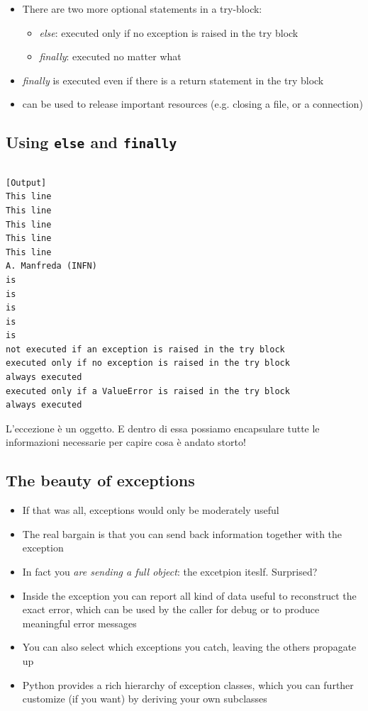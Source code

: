   \begin{itemize}
    \item There are two more optional statements in a try-block:
    \medskip
    \begin{itemize}
      \item \emph{else}: executed only if no exception is raised in the try block
      \medskip
      \item \emph{finally}: executed no matter what
      \medskip
    \end{itemize}
    \item \emph{finally} is executed even if there is a return statement in the try
          block
    \item can be used to release important resources (e.g. closing a
          file, or a connection)
  \end{itemize}

\subsection{Using \texttt{else} and \texttt{finally}}

\inputminted{python}{snippets/exceptions.py}
\begin{verbatim}
[Output]
This line
This line
This line
This line
This line
A. Manfreda (INFN)
is
is
is
is
is
not executed if an exception is raised in the try block
executed only if no exception is raised in the try block
always executed
executed only if a ValueError is raised in the try block
always executed
\end{verbatim}


L'eccezione è un oggetto. E dentro di essa possiamo encapsulare tutte le informazioni necessarie per capire cosa è andato storto!



\subsection{The beauty of exceptions}
  \begin{itemize}
    \item If that was all, exceptions would only be moderately useful
    \item The real bargain is that you can send back information together with the exception
    \item In fact you \textit{are sending a full object}: the excetpion iteslf. Surprised?
    \item Inside the exception you can report all kind of data useful to reconstruct the exact error,
          which can be used by the caller for debug or to produce meaningful error messages
    \item You can also select which exceptions you catch, leaving the others propagate up
    \item Python provides a rich hierarchy of exception classes, which you can further customize
          (if you want) by deriving your own subclasses
  \end{itemize}

